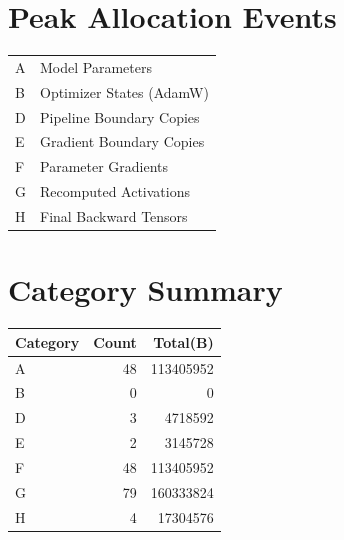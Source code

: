 \documentclass{article}
\begin{document}
\section*{Peak Allocation Events}
\small
\begin{tabular}{ll}
A & Model Parameters \\
B & Optimizer States (AdamW) \\
D & Pipeline Boundary Copies \\
E & Gradient Boundary Copies \\
F & Parameter Gradients \\
G & Recomputed Activations \\
H & Final Backward Tensors \\
\end{tabular}
\vspace{0.5em}
\section*{Category Summary}
\begin{tabular}{l r r}
Category & Count & Total(B) \\
\hline
A & 48 & 113405952 \\
B & 0 & 0 \\
D & 3 & 4718592 \\
E & 2 & 3145728 \\
F & 48 & 113405952 \\
G & 79 & 160333824 \\
H & 4 & 17304576 \\
\end{tabular}
\vspace{0.5em}
\end{document}
